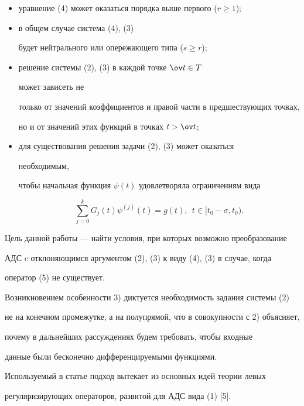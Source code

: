 \begin{itemize}


\item[1)] уравнение (4) может оказаться порядка выше первого ($r\ge 1$);


\item[2)] в общем случае система (4), (3)


будет нейтрального или опережающего типа ($s \ge r$);


\item[3)] решение системы (2), (3) в каждой точке $\ov t \in T$


может зависеть не


только от значений коэффициентов и правой части в предшествующих точках,


но и от значений этих функций в точках $t> \ov t$;


\item[4)] для существования решения задачи (2), (3) может оказаться


необходимым,


чтобы начальная функция $\psi(t)$ удовлетворяла ограничениям вида


$$


\sum_{j=0}^{k} {G_j(t) \psi^{(j)}(t)}=g(t), \ \ t \in [t_0-\sigma, t_0).


$$


\end{itemize}





Цель данной работы --- найти условия, при которых возможно преобразование


АДС c отклоняющимся аргументом (2), (3) к виду (4), (3) в случае, когда 


оператор (5) не существует.





Возникновением особенности 3) диктуется необходимость задания системы (2)


не на конечном промежутке, а на полупрямой, что в совокупности с 2) объясняет,


почему в дальнейших рассуждениях будем требовать, чтобы входные


данные были бесконечно дифференцируемыми функциями.





Используемый в статье подход вытекает из основных идей теории левых


регуляризирующих операторов, развитой для АДС вида (1) [5].





